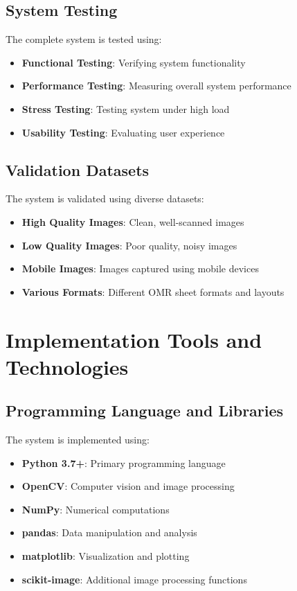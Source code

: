 \subsection{System Testing}

The complete system is tested using:

\begin{itemize}
\item \textbf{Functional Testing}: Verifying system functionality
\item \textbf{Performance Testing}: Measuring overall system performance
\item \textbf{Stress Testing}: Testing system under high load
\item \textbf{Usability Testing}: Evaluating user experience
\end{itemize}

\subsection{Validation Datasets}

The system is validated using diverse datasets:

\begin{itemize}
\item \textbf{High Quality Images}: Clean, well-scanned images
\item \textbf{Low Quality Images}: Poor quality, noisy images
\item \textbf{Mobile Images}: Images captured using mobile devices
\item \textbf{Various Formats}: Different OMR sheet formats and layouts
\end{itemize}

\section{Implementation Tools and Technologies}

\subsection{Programming Language and Libraries}

The system is implemented using:

\begin{itemize}
\item \textbf{Python 3.7+}: Primary programming language
\item \textbf{OpenCV}: Computer vision and image processing
\item \textbf{NumPy}: Numerical computations
\item \textbf{pandas}: Data manipulation and analysis
\item \textbf{matplotlib}: Visualization and plotting
\item \textbf{scikit-image}: Additional image processing functions
\end{itemize}

